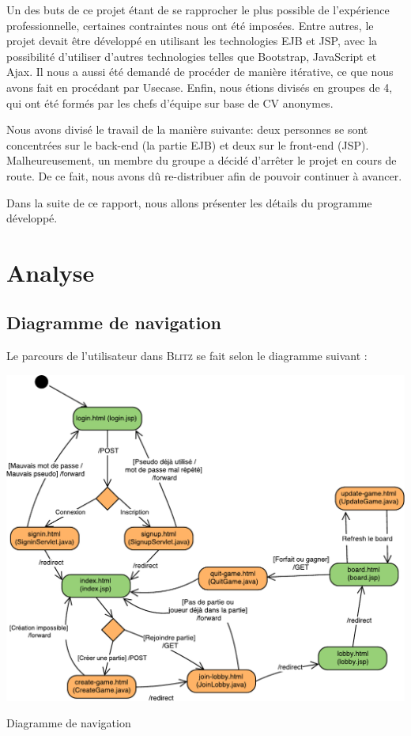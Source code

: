 \documentclass[11pt]{scrreprt}
\begin{document}
    Un des buts de ce projet étant de se rapprocher le plus possible de l'expérience professionnelle, certaines contraintes nous ont été imposées. Entre autres, le projet devait être développé en utilisant les technologies EJB et JSP, avec la possibilité d'utiliser d'autres technologies telles que Bootstrap, JavaScript et Ajax. Il nous a aussi été demandé de procéder de manière itérative, ce que nous avons fait en procédant par Usecase. Enfin, nous étions divisés en groupes de 4, qui ont été formés par les chefs d'équipe sur base de CV anonymes.

    Nous avons divisé le travail de la manière suivante: deux personnes se sont concentrées sur le back-end (la partie EJB) et deux sur le front-end (JSP). Malheureusement, un membre du groupe a décidé d'arrêter le projet en cours de route. De ce fait, nous avons dû re-distribuer afin de pouvoir continuer à avancer.

    Dans la suite de ce rapport, nous allons présenter les détails du programme développé.

    \chapter{Analyse}
    \section{Diagramme de navigation}
    Le parcours de l'utilisateur dans \textsc{Blitz} se fait selon le diagramme suivant :

    \begin{table}[H]
        \centering
        \includegraphics[width=\textwidth]{images/diag-nav.pdf}
        \caption{Diagramme de navigation}
    \end{table}
\end{document}
